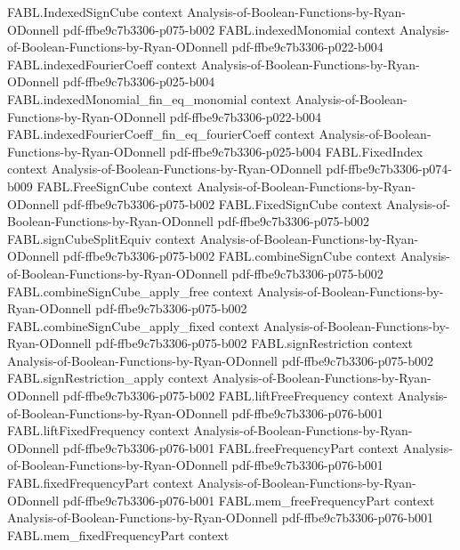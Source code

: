 \begin{theorem}
\proofstep
  {FABL.IndexedSignCube}
  {context}
  {Analysis-of-Boolean-Functions-by-Ryan-ODonnell}
  {pdf-ffbe9c7b3306-p075-b002}
\proofstep
  {FABL.indexedMonomial}
  {context}
  {Analysis-of-Boolean-Functions-by-Ryan-ODonnell}
  {pdf-ffbe9c7b3306-p022-b004}
\proofstep
  {FABL.indexedFourierCoeff}
  {context}
  {Analysis-of-Boolean-Functions-by-Ryan-ODonnell}
  {pdf-ffbe9c7b3306-p025-b004}
\proofstep
  {FABL.indexedMonomial_fin_eq_monomial}
  {context}
  {Analysis-of-Boolean-Functions-by-Ryan-ODonnell}
  {pdf-ffbe9c7b3306-p022-b004}
\proofstep
  {FABL.indexedFourierCoeff_fin_eq_fourierCoeff}
  {context}
  {Analysis-of-Boolean-Functions-by-Ryan-ODonnell}
  {pdf-ffbe9c7b3306-p025-b004}
\proofstep
  {FABL.FixedIndex}
  {context}
  {Analysis-of-Boolean-Functions-by-Ryan-ODonnell}
  {pdf-ffbe9c7b3306-p074-b009}
\proofstep
  {FABL.FreeSignCube}
  {context}
  {Analysis-of-Boolean-Functions-by-Ryan-ODonnell}
  {pdf-ffbe9c7b3306-p075-b002}
\proofstep
  {FABL.FixedSignCube}
  {context}
  {Analysis-of-Boolean-Functions-by-Ryan-ODonnell}
  {pdf-ffbe9c7b3306-p075-b002}
\proofstep
  {FABL.signCubeSplitEquiv}
  {context}
  {Analysis-of-Boolean-Functions-by-Ryan-ODonnell}
  {pdf-ffbe9c7b3306-p075-b002}
\proofstep
  {FABL.combineSignCube}
  {context}
  {Analysis-of-Boolean-Functions-by-Ryan-ODonnell}
  {pdf-ffbe9c7b3306-p075-b002}
\proofstep
  {FABL.combineSignCube_apply_free}
  {context}
  {Analysis-of-Boolean-Functions-by-Ryan-ODonnell}
  {pdf-ffbe9c7b3306-p075-b002}
\proofstep
  {FABL.combineSignCube_apply_fixed}
  {context}
  {Analysis-of-Boolean-Functions-by-Ryan-ODonnell}
  {pdf-ffbe9c7b3306-p075-b002}
\proofstep
  {FABL.signRestriction}
  {context}
  {Analysis-of-Boolean-Functions-by-Ryan-ODonnell}
  {pdf-ffbe9c7b3306-p075-b002}
\proofstep
  {FABL.signRestriction_apply}
  {context}
  {Analysis-of-Boolean-Functions-by-Ryan-ODonnell}
  {pdf-ffbe9c7b3306-p075-b002}
\proofstep
  {FABL.liftFreeFrequency}
  {context}
  {Analysis-of-Boolean-Functions-by-Ryan-ODonnell}
  {pdf-ffbe9c7b3306-p076-b001}
\proofstep
  {FABL.liftFixedFrequency}
  {context}
  {Analysis-of-Boolean-Functions-by-Ryan-ODonnell}
  {pdf-ffbe9c7b3306-p076-b001}
\proofstep
  {FABL.freeFrequencyPart}
  {context}
  {Analysis-of-Boolean-Functions-by-Ryan-ODonnell}
  {pdf-ffbe9c7b3306-p076-b001}
\proofstep
  {FABL.fixedFrequencyPart}
  {context}
  {Analysis-of-Boolean-Functions-by-Ryan-ODonnell}
  {pdf-ffbe9c7b3306-p076-b001}
\proofstep
  {FABL.mem_freeFrequencyPart}
  {context}
  {Analysis-of-Boolean-Functions-by-Ryan-ODonnell}
  {pdf-ffbe9c7b3306-p076-b001}
\proofstep
  {FABL.mem_fixedFrequencyPart}
  {context}

\end{theorem}
